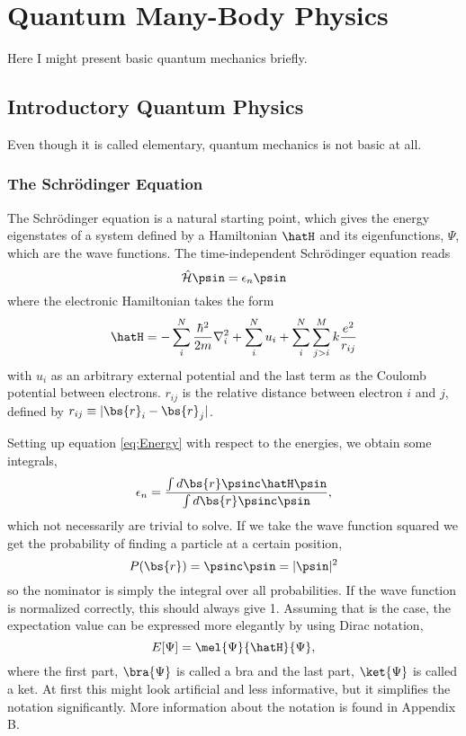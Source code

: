 \chapter{Quantum Many-Body Physics} \label{sec:quantum}
Here I might present basic quantum mechanics briefly.

\section{Introductory Quantum Physics} \label{subsec:elementary}
Even though it is called elementary, quantum mechanics is not basic at all. 

\subsection{The Schrödinger Equation} \label{subsubsec:schrodinger}
The Schrödinger equation is a natural starting point, which gives the energy eigenstates of a system defined by a Hamiltonian $\hatH$ and its eigenfunctions, $\Psi$, which are the wave functions. The time-independent Schrödinger equation reads
\begin{equation}
\label{eq:Energy}
 \hat{\mathcal{H}}\psin=\epsilon_n\psin
\end{equation}
where the electronic Hamiltonian takes the form
\begin{equation}
\hatH=-\sum_i^N\frac{\hbar^2}{2m}\nabla_i^2+\sum_i^Nu_i + \sum_i^N\sum_{j>i}^Mk\frac{e^2}{r_{ij}}
\end{equation}
with $u_i$ as an arbitrary external potential and the last term as the Coulomb potential between electrons. $r_{ij}$ is the relative distance between electron $i$ and $j$, defined by $r_{ij}\equiv|\bs{r}_i-\bs{r}_j|$.

Setting up equation \eqref{eq:Energy} with respect to the energies, we obtain some integrals,
\begin{equation}
\epsilon_n=\frac{\int d\bs{r}\psinc\hatH\psin}{\int d\bs{r}\psinc\psin},
\label{eq:energyintegral}
\end{equation}
which not necessarily are trivial to solve. If we take the wave function squared we get the probability of finding a particle at a certain position,
\begin{equation}
P(\bs{r})=\psinc\psin=|\psin|^2
\end{equation}
so the nominator is simply the integral over all probabilities. If the wave function is normalized correctly, this should always give 1. Assuming that is the case, the expectation value can be expressed more elegantly by using Dirac notation,
\begin{equation}
E[\Psi]=\mel{\Psi}{\hatH}{\Psi},
\end{equation}
where the first part, $\bra{\Psi}$ is called a bra and the last part, $\ket{\Psi}$ is called a ket. At first this might look artificial and less informative, but it simplifies the notation significantly. More information about the notation is found in Appendix B. 

